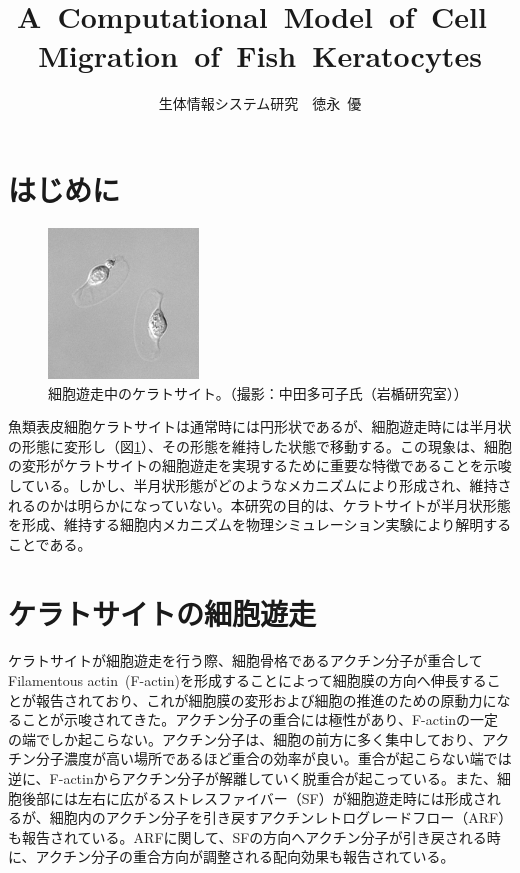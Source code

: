 \documentclass[10pt,twocolumn,a4j]{jarticle}
\title{A~Computational~Model~of~Cell~Migration~of~Fish~Keratocytes}
\author{生体情報システム研究~~徳永~優}
\date{}
\begin{document}
\maketitle
\section{はじめに}
\begin{figure}[tbp]
\centering
\includegraphics[width=4cm]{kera.eps}
\caption{細胞遊走中のケラトサイト。（撮影：中田多可子氏（岩楯研究室））}
\label{fig:kera}
\end{figure}
魚類表皮細胞ケラトサイトは通常時には円形状であるが、細胞遊走時には半月状の形態に変形し（図\ref{fig:kera}）、その形態を維持した状態で移動する。この現象は、細胞の変形がケラトサイトの細胞遊走を実現するために重要な特徴であることを示唆している。しかし、半月状形態がどのようなメカニズムにより形成され、維持されるのかは明らかになっていない。本研究の目的は、ケラトサイトが半月状形態を形成、維持する細胞内メカニズムを物理シミュレーション実験により解明することである。
\section{ケラトサイトの細胞遊走}
ケラトサイトが細胞遊走を行う際、細胞骨格であるアクチン分子が重合してFilamentous actin~(F-actin)を形成することによって細胞膜の方向へ伸長することが報告されており、これが細胞膜の変形および細胞の推進のための原動力になることが示唆されてきた\cite{svitkina1997analysis}。アクチン分子の重合には極性があり、F-actinの一定の端でしか起こらない。アクチン分子は、細胞の前方に多く集中しており、アクチン分子濃度が高い場所であるほど重合の効率が良い\cite{yumura1998spatiotemporal}。重合が起こらない端では逆に、F-actinからアクチン分子が解離していく脱重合が起こっている。また、細胞後部には左右に広がるストレスファイバー（SF）が細胞遊走時には形成されるが、細胞内のアクチン分子を引き戻すアクチンレトログレードフロー（ARF）も報告されている\cite{nakashima2015molecular}。ARFに関して、SFの方向へアクチン分子が引き戻される時に、アクチン分子の重合方向が調整される配向効果も報告されている\cite{swaminathan2017actin}。
\end{document}
